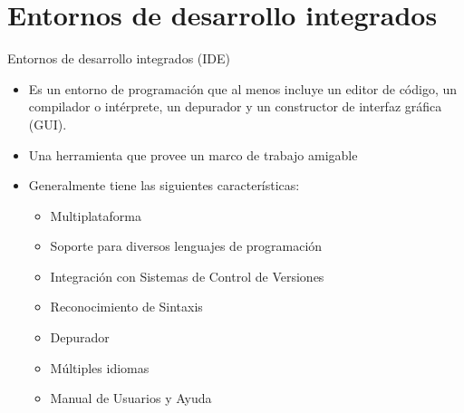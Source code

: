 \section{Entornos de desarrollo integrados}

\begin{frame}[c]{Entornos de desarrollo integrados (IDE)}
  \begin{itemize}
    \item Es un entorno de programación que al menos incluye un editor de
      código, un compilador o intérprete, un depurador y un constructor de
      interfaz gráfica (GUI).
    \pausa
    \item Una herramienta que provee un marco de trabajo amigable
    \pausa
    \item Generalmente tiene las siguientes características:
      \begin{itemize}
        \item Multiplataforma
        \pausa
        \item Soporte para diversos lenguajes de programación
        \pausa
        \item Integración con Sistemas de Control de Versiones
        \pausa
        \item Reconocimiento de Sintaxis
        \pausa
        \item Depurador
        \pausa
        \item Múltiples idiomas
        \pausa
        \item Manual de Usuarios y Ayuda
      \end{itemize}
  \end{itemize}
\end{frame}
